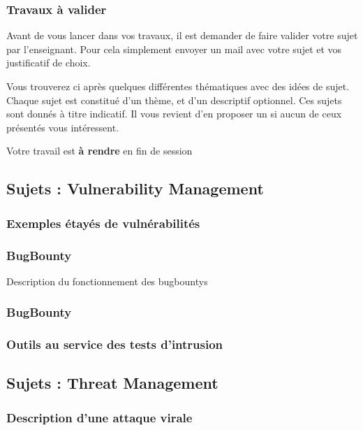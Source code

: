 \begin{frame}
\frametitle<presentation>{Travaux à valider}
Avant de vous lancer dans vos travaux, il est demander de faire valider votre sujet par l'enseignant. Pour cela simplement envoyer un mail avec votre sujet et vos justificatif de choix.

Vous trouverez ci après quelques différentes thématiques avec des idées de sujet. Chaque sujet est constitué d'un thème, et d'un descriptif optionnel.
Ces sujets sont donnés à titre indicatif. Il vous revient d'en proposer un si aucun de ceux présentés vous intéressent.

Votre travail est \textbf{à rendre} en fin de session

\end{frame}

\subsection{Sujets : Vulnerability Management}
\subsubsection{Exemples étayés de vulnérabilités}
\subsubsection{BugBounty}
Description du fonctionnement des bugbountys
\subsubsection{BugBounty}

\subsubsection{Outils au service des tests d'intrusion}

\subsection{Sujets : Threat Management}
\subsubsection{Description d'une attaque virale}
